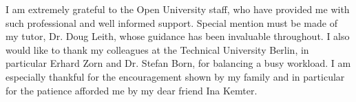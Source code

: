 \begin{acknowledgements}
\addchaptertocentry{\acknowledgementname} %
I am extremely grateful to the Open University staff, who have provided me with such professional and well informed support. Special mention must be made of my tutor, Dr. Doug Leith, whose guidance has been invaluable throughout. I also would like to thank my colleagues at the Technical University Berlin, in particular Erhard Zorn and Dr. Stefan Born, for balancing a busy workload. I am especially thankful for the encouragement shown by my family and in particular for the patience afforded me by my dear friend Ina Kemter.
\end{acknowledgements}

